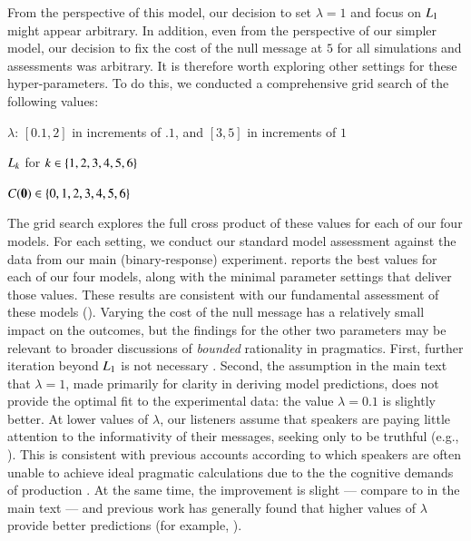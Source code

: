 \documentclass[leqno,12pt]{article}
\begin{document}
\begin{appendix}
From the perspective of this model, our decision to set $\lambda=1$
and focus on $\UncertaintyListener[1]$ might appear arbitrary.  In
addition, even from the perspective of our simpler model, our decision
to fix the cost of the null message at $5$ for all simulations and
assessments was arbitrary. It is therefore worth exploring other
settings for these hyper-parameters. To do this, we conducted a
comprehensive grid search of the following values:
%
\begin{examples}
\item
  \begin{examples}
  \item $\lambda$: $[0.1, 2]$ in increments of $.1$, and $[3,5]$ in increments of $1$
  \item $\UncertaintyListener[k]$ for $k \in \set{1,2,3,4,5,6}$
  \item $\Costs(\nullmsg) \in \set{0, 1, 2, 3, 4, 5, 6}$
  \end{examples}
\end{examples}

The grid search explores the full cross product of these values for
each of our four models. For each setting, we conduct our standard
model assessment against the data from our main (binary-response)
experiment.  reports the best values for each of our
four models, along with the minimal parameter settings that deliver
those values. These results are consistent with our fundamental
assessment of these models ().  Varying the
cost of the null message has a relatively small impact on the
outcomes, but the findings for the other two parameters may be
relevant to broader discussions of \emph{bounded} rationality in
pragmatics. First, further iteration beyond $\UncertaintyListener[1]$
is not necessary \citep{Vogel-etal:2014}. Second, the assumption in
the main text that $\lambda=1$, made primarily for clarity in deriving
model predictions, does not provide the optimal fit to the
experimental data: the value $\lambda = 0.1$ is slightly better.  At
lower values of $\lambda$, our listeners assume that speakers are
paying little attention to the informativity of their messages,
seeking only to be truthful (e.g., \citealt{McMahan:Stone:2015}).
This is consistent with previous accounts according to which speakers
are often unable to achieve ideal pragmatic calculations due to the
the cognitive demands of production
\citep{pechmann1989,levelt1993,engelhardt2006,dale1995,van-deemter2012,gatt2013}. At
the same time, the improvement is slight --- compare 
to  in the main text --- and previous work
has generally found that higher values of $\lambda$ provide better
predictions (for example,
\citealt{Kao2014,Kao-etal:2014,lassitergoodman15}).


\end{appendix}
\end{document}
